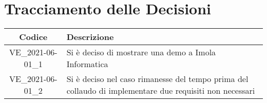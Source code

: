 \section*{Tracciamento delle Decisioni}

\begin{center}
	\begin{longtable}{|c|p{13cm}|}
	\hline
	\rowcolor{lighter-grayer}
	\textbf{Codice} & \textbf{Descrizione} \\
	\hline
	\endfirsthead

	\hline
	VE\_2021-06-01\_1 & Si è deciso di mostrare una demo a Imola Informatica \\	
	VE\_2021-06-01\_2 & Si è deciso nel caso rimanesse del tempo prima del collaudo di implementare due requisiti non necessari \\			
	\hline

	\end{longtable}
\end{center}